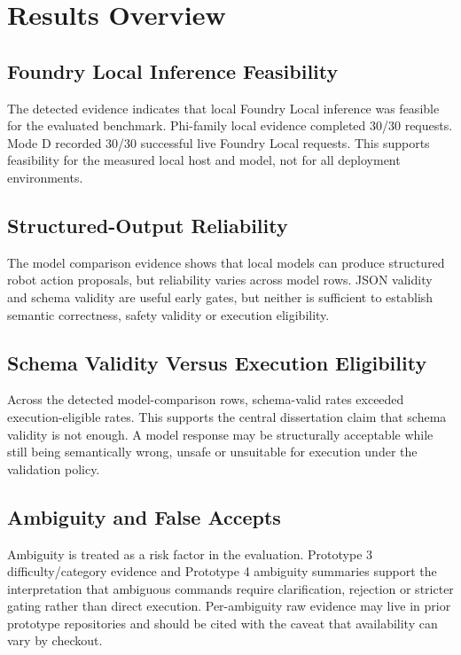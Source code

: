 \section{Results Overview}
\label{sec:results_overview}

\subsection{Foundry Local Inference Feasibility}

The detected evidence indicates that local Foundry Local inference was feasible for the evaluated benchmark. Phi-family local evidence completed 30/30 requests. Mode D recorded 30/30 successful live Foundry Local requests. This supports feasibility for the measured local host and model, not for all deployment environments.

\subsection{Structured-Output Reliability}

The model comparison evidence shows that local models can produce structured robot action proposals, but reliability varies across model rows. JSON validity and schema validity are useful early gates, but neither is sufficient to establish semantic correctness, safety validity or execution eligibility.

\subsection{Schema Validity Versus Execution Eligibility}

Across the detected model-comparison rows, schema-valid rates exceeded execution-eligible rates. This supports the central dissertation claim that schema validity is not enough. A model response may be structurally acceptable while still being semantically wrong, unsafe or unsuitable for execution under the validation policy.

\subsection{Ambiguity and False Accepts}

Ambiguity is treated as a risk factor in the evaluation. Prototype 3 difficulty/category evidence and Prototype 4 ambiguity summaries support the interpretation that ambiguous commands require clarification, rejection or stricter gating rather than direct execution. Per-ambiguity raw evidence may live in prior prototype repositories and should be cited with the caveat that availability can vary by checkout.

